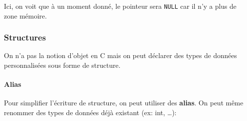 Ici, on voit que à un moment donné, le pointeur sera \texttt{NULL} car
il n'y a plus de zone mémoire.

\subsubsection{Structures}\label{structures}

On n'a pas la notion d'objet en C mais on peut déclarer des types de
données personnalisées sous forme de structure.

\begin{Shaded}
\begin{Highlighting}[]
\OperatorTok{\{}
    \OperatorTok{;}
    \OperatorTok{;}
    \OperatorTok{;}
\OperatorTok{\}}

\OperatorTok{=} \OperatorTok{\{}\OperatorTok{,} \OperatorTok{,} \OperatorTok{\};}
\OperatorTok{;}\OperatorTok{;}\OperatorTok{;}
\end{Highlighting}
\end{Shaded}

\paragraph{Alias}\label{alias}

Pour simplifier l'écriture de structure, on peut utiliser des
\textbf{alias}. On peut même renommer des types de données déjà existant
(ex: int, \ldots):

\begin{Shaded}
\begin{Highlighting}[]
 \OperatorTok{\{} 
    \OperatorTok{;} 
    \OperatorTok{;} 
\OperatorTok{\}}\OperatorTok{;}

 \OperatorTok{;}

\OperatorTok{(}\OperatorTok{,}  \OperatorTok{*}\OperatorTok{[])} \OperatorTok{\{}
\OperatorTok{=} \OperatorTok{\{}\OperatorTok{,} \OperatorTok{\};} 
\OperatorTok{=} \OperatorTok{;} 
    \OperatorTok{;}
\OperatorTok{\}}
\end{Highlighting}
\end{Shaded}

